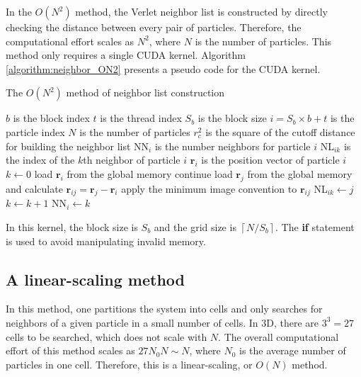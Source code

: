 \documentclass[12pt,a4paper]{report}
\newcommand{\vect}[1]{\boldsymbol{#1}}
\begin{document}
In the $O(N^2)$ method, the Verlet neighbor list is constructed by directly checking the distance between every pair of particles. Therefore, the computational effort scales as $N^2$, where $N$ is the number of particles. This method only requires a single CUDA kernel.
Algorithm \ref{algorithm:neighbor_ON2} presents a pseudo code for the CUDA kernel.

\begin{algorithm}[htb]
\caption{The $O(N^2)$ method of neighbor list construction }
\label{algorithm:neighbor_ON2}
\begin{algorithmic}[1]
\Require $b$ is the block index
\Require $t$ is the thread index
\Require $S_b$ is the block size
\Require $i=S_b\times b+t$ is the particle index
\Require $N$ is the number of particles
\Require $r_c^2$ is the square of the cutoff distance for building the neighbor list
\Require NN$_{i}$ is the number neighbors for particle $i$
\Require NL$_{ik}$ is the index of the $k$th neighbor of particle $i$
\Require $\vect{r}_{i}$ is the position vector of particle $i$
\State $k\leftarrow 0$
    \State load $\vect{r}_{i}$ from the global memory
            \State continue
        \EndIf
        \State load $\vect{r}_{j}$ from the global memory and calculate
               $\vect{r}_{ij} = \vect{r}_{j} - \vect{r}_{i}$
        \State apply the minimum image convention to $\vect{r}_{ij}$
        \If {$|\vect{r}_{ij}|^2 < r_c^2$}
            \State NL$_{ik}\leftarrow j$
            \State $k\leftarrow k+1$
        \EndIf
    \EndFor
    \State NN$_{i}\leftarrow k$
\EndIf
 \end{algorithmic}
\end{algorithm}

In this kernel, the block size is $S_b$ and the grid size is $\left \lceil {N/S_b} \right \rceil$. The \textbf{if} statement is used to avoid manipulating invalid memory.


\subsection{A linear-scaling method}


In this method, one partitions the system into cells and only searches for neighbors of a given particle in a small number of cells. In 3D, there are $3^3=27$ cells to be searched, which does not scale with $N$. The overall computational effort of this method scales as $27N_0N \sim N$, where $N_0$ is the average number of particles in one cell. Therefore, this is a linear-scaling, or $O(N)$ method.
\end{document}
